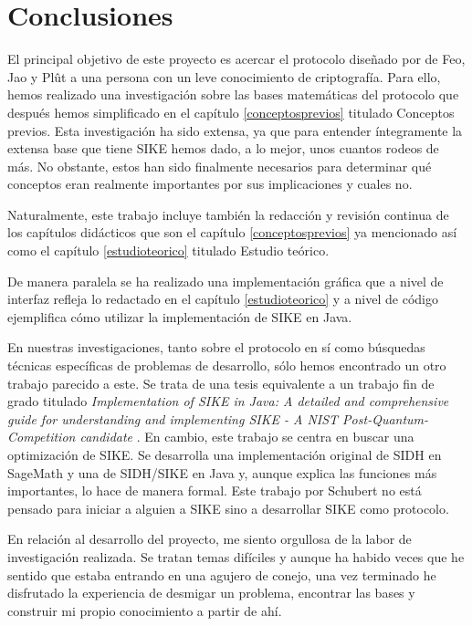 \chapter{Conclusiones}\label{conclusiones}

El principal objetivo de este proyecto es acercar el protocolo diseñado por de Feo, Jao y Plût a una persona con un leve conocimiento de criptografía. Para ello, hemos realizado una investigación sobre las bases matemáticas del protocolo que después hemos simplificado en el capítulo \ref{conceptosprevios} titulado Conceptos previos. Esta investigación ha sido extensa, ya que para entender íntegramente la extensa base que tiene SIKE hemos dado, a lo mejor, unos cuantos rodeos de más. No obstante, estos han sido finalmente necesarios para determinar qué conceptos eran realmente importantes por sus implicaciones y cuales no.

Naturalmente, este trabajo incluye también la redacción y revisión continua de los capítulos didácticos que son el capítulo \ref{conceptosprevios}  ya mencionado así como el capítulo \ref{estudioteorico} titulado Estudio teórico. 

De manera paralela se ha realizado una implementación gráfica que a nivel de interfaz refleja lo redactado en el capítulo \ref{estudioteorico} y a nivel de código ejemplifica cómo utilizar la implementación de SIKE en Java.

En nuestras investigaciones, tanto sobre el protocolo en sí como búsquedas técnicas específicas de problemas de desarrollo, sólo hemos encontrado un otro trabajo parecido a este. Se trata de una tesis equivalente a un trabajo fin de grado titulado \textit{Implementation of SIKE in Java: A detailed and comprehensive guide for understanding and implementing SIKE - A NIST Post-Quantum-Competition candidate} \cite{sike-implementation}. En cambio, este trabajo se centra en buscar una optimización de SIKE. Se desarrolla una implementación original de SIDH en SageMath y una de SIDH/SIKE en Java y, aunque explica las funciones más importantes, lo hace de manera formal. Este trabajo por Schubert no está pensado para iniciar a alguien a SIKE sino a desarrollar SIKE como protocolo.

En relación al desarrollo del proyecto, me siento orgullosa de la labor de investigación realizada. Se tratan temas difíciles y aunque ha habido veces que he sentido que estaba entrando en una agujero de conejo, una vez terminado he disfrutado la experiencia de desmigar un problema, encontrar las bases y construir mi propio conocimiento a partir de ahí.


